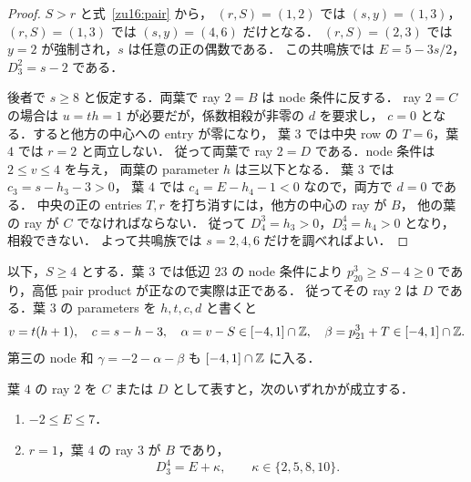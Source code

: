 \begin{proof}
$S>r$ と式~\eqref{zu16:pair} から，
$(r,S)=(1,2)$ では $(s,y)=(1,3)$，
$(r,S)=(1,3)$ では $(s,y)=(4,6)$ だけとなる．
$(r,S)=(2,3)$ では $y=2$ が強制され，$s$ は任意の正の偶数である．
この共鳴族では $E=5-3s/2$，$D^2_3=s-2$ である．

後者で $s\ge8$ と仮定する．両葉で ray $2=B$ は node 条件に反する．
ray $2=C$ の場合は $u=th=1$ が必要だが，係数相殺が非零の $d$ を要求し，
$c=0$ となる．すると他方の中心への entry が零になり，
葉 $3$ では中央 row の $T=6$，葉 $4$ では $r=2$ と両立しない．
従って両葉で ray $2=D$ である．node 条件は $2\le v\le4$ を与え，
両葉の parameter $h$ は三以下となる．
葉 $3$ では $c_3=s-h_3-3>0$，
葉 $4$ では $c_4=E-h_4-1<0$ なので，両方で $d=0$ である．
中央の正の entries $T,r$ を打ち消すには，他方の中心の ray が $B$，
他の葉の ray が $C$ でなければならない．
従って $D^3_4=h_3>0$，$D^4_3=h_4>0$ となり，相殺できない．
よって共鳴族では $s=2,4,6$ だけを調べればよい．
\end{proof}

以下，$S\ge4$ とする．葉 $3$ では低辺 $23$ の node 条件により
$p^3_{20}\ge S-4\ge0$ であり，高低 pair product が正なので実際は正である．
従ってその ray $2$ は $D$ である．葉 $3$ の parameters を $h,t,c,d$ と書くと
\begin{equation}\label{zu16:leaf3}
 v=t(h+1),\quad c=s-h-3,\quad
 \alpha=v-S\in[-4,1]\cap\mathbb Z,\quad
 \beta=p^3_{21}+T\in[-4,1]\cap\mathbb Z .
\end{equation}
第三の node 和 $\gamma=-2-\alpha-\beta$ も $[-4,1]\cap\mathbb Z$ に入る．

\begin{lemma}[非 $B$ 葉の有限分岐]
\label{zu16:nonB-split}
葉 $4$ の ray $2$ を $C$ または $D$ として表すと，次のいずれかが成立する．
\begin{enumerate}
\item $-2\le E\le7$．
\item $r=1$，葉 $4$ の ray $3$ が $B$ であり，
\[
 D^4_3=E+\kappa,\qquad \kappa\in\{2,5,8,10\}.
\]
\end{enumerate}
\end{lemma}

